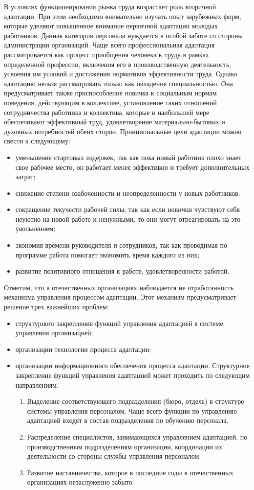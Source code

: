 \documentclass[a4paper,12pt,oneside,final]{extarticle}
\numberwithin{equation}{section}
\begin{document}
В условиях функционирования рынка труда возрастает роль вторичной адаптации. 
При этом необходимо внимательно изучать опыт зарубежных фирм, которые уделяют повышенное внимание первичной адаптации молодых работников. 
Данная категория персонала нуждается в особой заботе со стороны администрации организаций. 
Чаще всего профессиональная адаптация рассматривается как процесс приобщения человека к труду в рамках определенной профессии, включения его в производственную деятельность, усвоения им условий и достижения нормативов эффективности труда. 
Однако адаптацию нельзя рассматривать только как овладение специальностью. 
Она предусматривает также приспособление новичка к социальным нормам поведения, действующим в коллективе, установление таких отношений сотрудничества работника и коллектива, которые в наибольшей мере обеспечивают эффективный труд, удовлетворение материально-бытовых и духовных потребностей обеих сторон.
Принципиальные цели адаптации можно свести к следующему:
\begin{itemize}
	\item уменьшение стартовых издержек, так как пока новый работник плохо знает свое рабочее место, он работает менее эффективно и требует дополнительных затрат;
	\item снижение степени озабоченности и неопределенности у новых работников;
	\item сокращение текучести рабочей силы, так как если новички чувствуют себя неуютно на новой работе и ненужными, то они могут отреагировать на это увольнением;
	\item экономия времени руководителя и сотрудников, так как проводимая по программе работа помогает экономить время каждого из них;
	\item развитие позитивного отношения к работе, удовлетворенности работой.
\end{itemize}
Отметим, что в отечественных организациях наблюдается не отработанность механизма управления процессом адаптации. Этот механизм предусматривает решение трех важнейших проблем:
\begin{itemize}
	\item структурного закрепления функций управления адаптацией в системе управления организацией;
	\item организации технологии процесса адаптации;
	\item организации информационного обеспечения процесса адаптации. 
	Структурное закрепление функций управления адаптацией может проходить по следующим направлениям.
	\begin{enumerate}
		\item Выделение соответствующего подразделения (бюро, отдела) в структуре системы управления персоналом. 
		Чаще всего функции по управлению адаптацией входят в состав подразделения по обучению персонала.
		\item Распределение специалистов, занимающихся управлением адаптацией, по производственным подразделениям организации, координации их деятельности со стороны службы управления персоналом.
		\item Развитие наставничества, которое в последние годы в отечественных организациях незаслуженно забыто.
	\end{enumerate}
\end{itemize}
\end{document}
